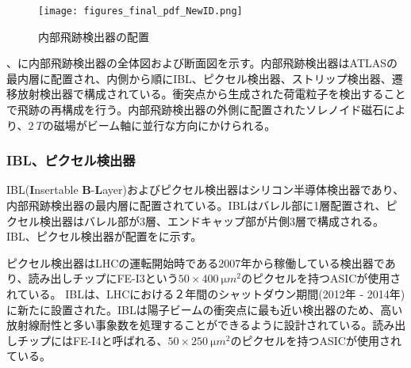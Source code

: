 \begin{figure}[tbp]
  \centering
  \texttt{[image: figures\_final\_pdf\_NewID.png]}
  \caption[内部飛跡検出器の配置]{内部飛跡検出器の配置 \cite{studyofID} }
  \label{fig:IDfigure}
\end{figure}


、に内部飛跡検出器の全体図および断面図を示す。内部飛跡検出器はATLASの最内層に配置され、内側から順にIBL、ピクセル検出器、ストリップ検出器、遷移放射検出器で構成されている。衝突点から生成された荷電粒子を検出することで飛跡の再構成を行う。内部飛跡検出器の外側に配置されたソレノイド磁石により、$2\ \si{T}$の磁場がビーム軸に並行な方向にかけられる。


\subsubsection{IBL、ピクセル検出器}
\label{sec:pixels}

IBL(\textbf{I}nsertable \textbf{B}-\textbf{L}ayer)およびピクセル検出器はシリコン半導体検出器であり、内部飛跡検出器の最内層に配置されている。IBLはバレル部に1層配置され、ピクセル検出器はバレル部が3層、エンドキャップ部が片側3層で構成される。IBL、ピクセル検出器が配置をに示す。

ピクセル検出器はLHCの運転開始時である2007年から稼働している検出器であり、読み出しチップにFE-I3という$50\times400\ \si{\micro m^2}$のピクセルを持つASICが使用されている。
IBLは、LHCにおける２年間のシャットダウン期間(2012年 - 2014年)に新たに設置された。IBLは陽子ビームの衝突点に最も近い検出器のため、高い放射線耐性と多い事象数を処理することができるように設計されている。読み出しチップにはFE-I4と呼ばれる、$50\times250\ \si{\micro m^2}$のピクセルを持つASICが使用されている。


